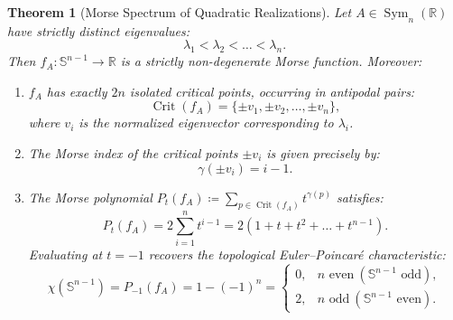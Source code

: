 \documentclass[11pt,a4paper,reqno]{amsart}
\newtheorem{theorem}{Theorem}[section]
\theoremstyle{definition}
\numberwithin{equation}{section}
\providecommand{\R}{\mathbb{R}}
\providecommand{\Sph}{\mathbb{S}}
\begin{document}
\begin{theorem}[Morse Spectrum of Quadratic Realizations]
\label{thm:morse_matrix}
Let $A \in \operatorname{Sym}_n(\R)$ have strictly distinct eigenvalues:
\begin{equation}
    \lambda_1 < \lambda_2 < \dots < \lambda_n.
\end{equation}
Then $f_A \colon \Sph^{n-1} \to \R$ is a strictly non-degenerate Morse function. Moreover:
\begin{enumerate}[label=(\roman*)]
    \item $f_A$ has exactly $2n$ isolated critical points, occurring in antipodal pairs:
    \begin{equation}
        \operatorname{Crit}(f_A) = \{\pm v_1, \pm v_2, \dots, \pm v_n\},
    \end{equation}
    where $v_i$ is the normalized eigenvector corresponding to $\lambda_i$.
    \item The Morse index of the critical points $\pm v_i$ is given precisely by:
    \begin{equation}
        \gamma(\pm v_i) = i - 1.
    \end{equation}
    \item The Morse polynomial $P_t(f_A) \coloneqq \sum_{p \in \operatorname{Crit}(f_A)} t^{\gamma(p)}$ satisfies:
    \begin{equation}
        P_t(f_A) = 2 \sum_{i=1}^n t^{i-1} = 2 (1 + t + t^2 + \dots + t^{n-1}).
    \end{equation}
    Evaluating at $t = -1$ recovers the topological Euler--Poincar\'e characteristic:
    \begin{equation}
        \chi(\Sph^{n-1}) = P_{-1}(f_A) = 1 - (-1)^n = \begin{cases} 0, & n \text{ even} \ (\Sph^{n-1} \text{ odd}), \\ 2, & n \text{ odd} \ (\Sph^{n-1} \text{ even}). \end{cases}
    \end{equation}
\end{enumerate}
\end{theorem}
\end{document}
